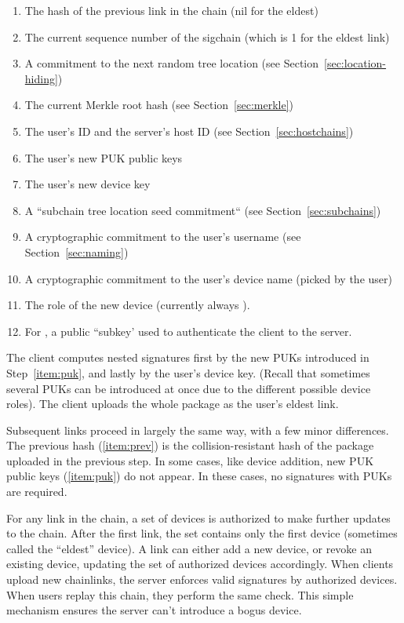 \begin{enumerate}[label=U.\arabic*]\itemsep0em
    \item \label{item:prev} The hash of the previous link in the chain (nil for the eldest)
    \item The current sequence number of the sigchain (which is 1 for the eldest link)
    \item A commitment to the next random tree location (see Section~\ref{sec:location-hiding})
      \label{item:next-tree-location}
    \item The current Merkle root hash (see Section~\ref{sec:merkle})
    \item The user's ID and the server's host ID (see Section~\ref{sec:hostchains})
    \item \label{item:puk} The user's new PUK public keys
    \item The user's new device key
    \item A ``subchain tree location seed commitment`` (see Section~\ref{sec:subchains})
      \label{item:stlsc}
    \item A cryptographic commitment to the user's username (see Section~\ref{sec:naming})
       \label{item:name}
    \item A cryptographic commitment to the user's device name (picked by the user)
    \item The role of the new device (currently always \owner ).
    \item For \yubis , a public ``subkey' used to authenticate the client
      to the server.
\end{enumerate}

The client computes nested signatures first by the new PUKs introduced in
Step~\ref{item:puk}, and lastly by the user's device key. (Recall that sometimes
several PUKs can be introduced at once due to the different possible device
roles). The client uploads the whole package as the user's eldest link.

Subsequent links proceed in largely the same way, with a few minor differences.
The previous hash (\ref{item:prev}) is the collision-resistant hash of the 
package uploaded in the previous step. In some cases, like device addition,
new PUK public keys (\ref{item:puk}) do not appear. In these cases,
no signatures with PUKs are required.

For any link in the chain, a set of devices is authorized to make further
updates to the chain. After the first link, the set contains only the first
device (sometimes called the ``eldest'' device). A link can either add a new
device, or revoke an existing device, updating the set of authorized devices
accordingly. When clients upload new chainlinks, the server enforces valid
signatures by authorized devices. When users replay this chain, they perform the
same check. This simple mechanism ensures the server can't introduce a bogus
device.


